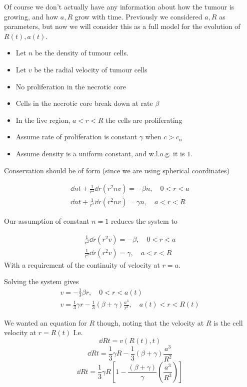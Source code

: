 \documentclass{X:/Documents/Coding/Latex/myassignment}
\begin{document}
Of course we don't actually have any information about how the tumour is growing, and how $a,R$ grow with time. Previously we considered $a,R$ as parameters, but now we will consider this as a full model for the evolution of $R(t), a(t)$.

\begin{itemize}
	\item Let $n$ be the density of tumour cells.
	\item Let $v$ be the radial velocity of tumour cells
	\item No proliferation in the necrotic core
	\item Cells in the necrotic core break down at rate $\beta$
	\item In the live region, $a<r<R$ the cells are proliferating
	\item Assume rate of proliferation is constant $\gamma$ when $c>c_n$
	\item Assume density is a uniform constant, and w.l.o.g. it is $1$.
\end{itemize}

Conservation should be of form (since we are using spherical coordinates)

\begin{align*}
\dd nt + \frac1{r^2} \dd{}r (r^2 nv) = - \beta n, \quad 0<r<a\\
\dd nt + \frac1{r^2} \dd{}r (r^2 nv) = \gamma n, \quad a<r<R	
\end{align*}

Our assumption of constant $n=1$ reduces the system to

\begin{align*}
\frac1{r^2} \dd{}r (r^2 v) = - \beta , \quad 0<r<a\\
\frac1{r^2} \dd{}r (r^2 v) = \gamma , \quad a<r<R	
\end{align*}
With a requirement of the continuity of velocity at $r=a$.

Solving the system gives
\begin{align*}
	v = -\frac13 \beta r, \quad 0 <r < a(t)\\
	v = \frac13 \gamma r - \frac13 \left(\beta + \gamma \right) \frac{a^3}{r^2}, \quad a(t) < r < R(t)
\end{align*}

We wanted an equation for $R$ though, noting that the velocity at $R$ is the cell velocity at $r = R(t)$
I.e.
\[\dd Rt = v(R(t),t)\]
\[\dd Rt = \frac13 \gamma R - \frac13 \left(\beta + \gamma \right) \frac{a^3}{R^2}\]
\[\dd Rt = \frac13 \gamma R \left[1 - \frac{(\beta + \gamma)}{\gamma} \left(\frac{a^3}{R^3}\right)\right]\]
\end{document}
